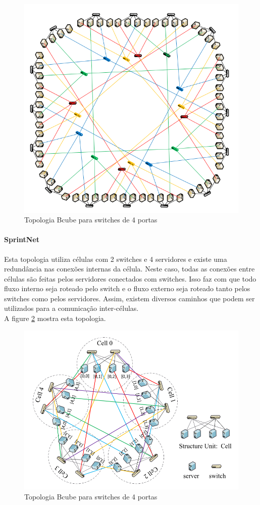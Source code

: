 \documentclass[12pt,a4paper]{report}
\begin{document}
\begin{figure}[H]
\centering
\includegraphics[width=.8\textwidth]{imagens/flatnet.png}
\caption{Topologia Bcube para switches de 4 portas}
\label{flatnet}
\end{figure}

\paragraph{SprintNet}
Esta topologia utiliza células com 2 switches e 4 servidores e existe uma redundância nas conexões internas da célula. Neste caso, todas as conexões entre células são feitas pelos servidores conectados com switches. Isso faz com que todo fluxo interno seja roteado pelo switch e o fluxo externo seja roteado tanto pelos switches como pelos servidores. Assim, existem diversos caminhos que podem ser utilizados para a comunicação inter-células.\\

A figure \ref{sprintnet} mostra esta topologia.\\

\begin{figure}[H]
\centering
\includegraphics[width=.8\textwidth]{imagens/springnet.png}
\caption{Topologia Bcube para switches de 4 portas}
\label{sprintnet}
\end{figure}
\end{document}
